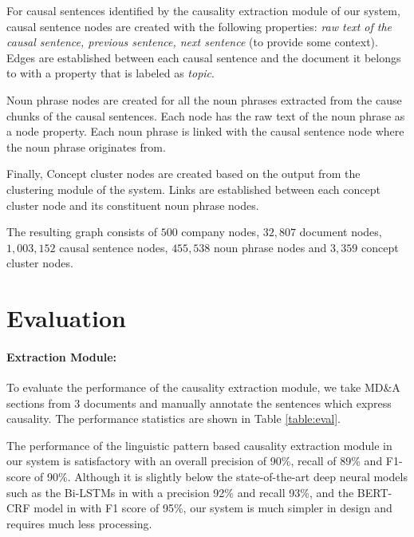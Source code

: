 For causal sentences identified by the causality extraction module of our system, causal sentence nodes are created with the following properties: \emph{raw text of the causal sentence, previous sentence, next sentence} (to provide some context). Edges are established between each causal sentence and the document it belongs to with a property that is labeled as \emph{topic}.

Noun phrase nodes are created for all the noun phrases extracted from the cause chunks of the causal sentences. Each node has the raw text of the noun phrase as a node property. Each noun phrase is linked with the causal sentence node where the noun phrase originates from. 

Finally, Concept cluster nodes are created based on the output from the clustering module of the system. Links are established between each concept cluster node and its constituent noun phrase nodes.
  
The resulting graph consists of $500$ company nodes, $32,807$ document nodes, $1,003,152$ causal sentence nodes, $455,538$ noun phrase nodes and $3,359$ concept cluster nodes. 



\section{Evaluation} \label{sec:evaluate}

\paragraph{Extraction Module:} To evaluate the performance of the causality extraction module, we take MD\&A sections from 3 documents and manually annotate the sentences which express causality. The performance statistics are shown in Table \ref{table:eval}.

The performance of the linguistic pattern based causality extraction module in our system is satisfactory with an overall precision of 90\%, recall of 89\% and F1-score of 90\%. Although it is slightly below the state-of-the-art deep neural models such as the Bi-LSTMs in \cite{Chen20} with a precision 92\% and recall 93\%, and the BERT-CRF model in \cite{NTUNLPL20} with F1 score of 95\%, our system is much simpler in design and requires much less processing. 


